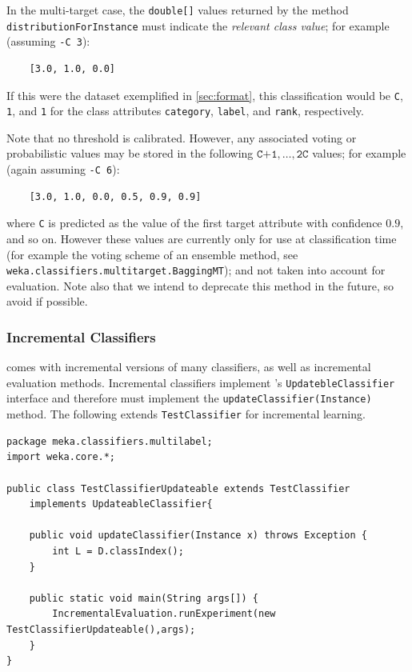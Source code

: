 \documentclass[11pt]{article}
\newcommand{\MEKA}{Meka}
\newcommand{\WEKA}{Weka}
\begin{document}

In the multi-target case, the \texttt{double[]} values returned by the method \texttt{distributionForInstance} must indicate the \emph{relevant class value}; for example (assuming \texttt{-C 3}): 
\begin{lstlisting}
	[3.0, 1.0, 0.0]
\end{lstlisting} 
If this were the dataset exemplified in \ref{sec:format}, this classification would be \texttt{C}, \texttt{1}, and \texttt{1} for the class attributes \texttt{category}, \texttt{label}, and \texttt{rank}, respectively.

Note that no threshold is calibrated. However, any associated voting or probabilistic values may be stored in the following $\texttt{C+1},\ldots,\texttt{2C}$ values; for example (again assuming \texttt{-C 6}):
\begin{lstlisting}
	[3.0, 1.0, 0.0, 0.5, 0.9, 0.9]
\end{lstlisting} 
where \texttt{C} is predicted as the value of the first target attribute with confidence $0.9$, and so on. However these values are currently only for use at classification time (for example the voting scheme of an ensemble method, see \texttt{weka.classifiers.multitarget.BaggingMT}); and not taken into account for evaluation. Note also that we intend to deprecate this method in the future, so avoid if possible.

\subsubsection{Incremental Classifiers}

\framework{\MEKA} comes with incremental versions of many classifiers, as well as incremental evaluation methods. Incremental classifiers implement \framework{\WEKA}'s \texttt{UpdatebleClassifier} interface and therefore must implement the \texttt{updateClassifier(Instance)} method. The following extends \texttt{TestClassifier} for incremental learning.

{
\small
\lstset{basicstyle=\small\ttfamily,breaklines=true,language=java,frame=L,xleftmargin=\parindent}
\begin{lstlisting}
package meka.classifiers.multilabel;
import weka.core.*;

public class TestClassifierUpdateable extends TestClassifier 
    implements UpdateableClassifier{
	
    public void updateClassifier(Instance x) throws Exception {
        int L = D.classIndex();
    }
    
    public static void main(String args[]) {
        IncrementalEvaluation.runExperiment(new TestClassifierUpdateable(),args);
    }
}
\end{lstlisting}
}
\end{document}
